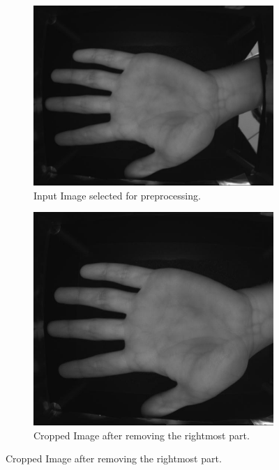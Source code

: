 \begin{enumerate}
    \begin{figure}[!ht]
        \centering
        \begin{subfigure}[t]{0.48\columnwidth}
            \includegraphics[width=\textwidth]{./images/preprocessing/selected_image.jpg}
            \caption{Input Image selected for preprocessing.}
            \label{fig:selected_image}
        \end{subfigure}
        \hfill
        \begin{subfigure}[t]{0.48\columnwidth}
            \includegraphics[width=\textwidth]{./images/preprocessing/cropped_image.png}
            \caption{Cropped Image after removing the rightmost part.} 
            \label{fig:cropped_image}
        \end{subfigure}
    \end{figure}


\end{enumerate}
